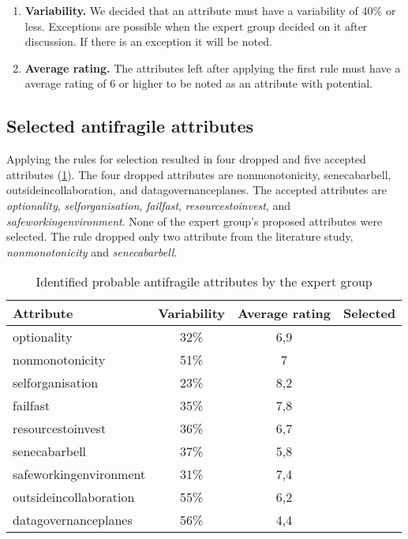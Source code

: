 \begin{enumerate}
	\item{\textbf{Variability.} We decided that an \gls{attribute} must have a variability of 40\% or less. Exceptions are possible when the expert group decided on it after discussion. If there is an exception it will be noted.}
	\item{\textbf{Average rating.} The attributes left after applying the first rule must have a average rating of 6 or higher to be noted as an attribute with potential.}
\end{enumerate}

\subsection{Selected antifragile attributes}
\label{sub:validationselectedafattributes}
Applying the rules for selection resulted in four dropped and five accepted \glspl{attribute} (\cref{tab:expertgrouppossiblesf}). The four dropped \glspl{attribute} are \gls{nonmonotonicity}, \gls{senecabarbell}, \gls{outsideincollaboration}, and \gls{datagovernanceplanes}. The accepted \glspl{attribute} are \textit{\gls{optionality}}, \textit{\gls{selforganisation}}, \textit{\gls{failfast}}, \textit{\gls{resourcestoinvest}}, and \textit{\gls{safeworkingenvironment}}. None of the expert group's proposed \glspl{attribute} were selected. The rule dropped only two \gls{attribute} from the literature study, \textit{\gls{nonmonotonicity}} and \textit{\gls{senecabarbell}}.
\begin{table}[H]
	\centering
		\begin{tabular}{@{}lccc@{}}
			\toprule
			\textbf{Attribute} & \textbf{Variability} & \textbf{Average rating} & \textbf{Selected} \\%
			\midrule
			\Gls{optionality} & 32\% & 6,9 & \checkmark \\%
			\Gls{nonmonotonicity} & 51\% & 7 &  \\%
			\Gls{selforganisation} & 23\% & 8,2 & \checkmark  \\%
			\Gls{failfast} & 35\% & 7,8 & \checkmark  \\%
			\Gls{resourcestoinvest} & 36\% & 6,7 & \checkmark \\%
			\Gls{senecabarbell} & 37\% & 5,8 &  \\%
			\Gls{safeworkingenvironment} & 31\% & 7,4 & \checkmark  \\%
			\Gls{outsideincollaboration} & 55\% & 6,2 &  \\%
			\Gls{datagovernanceplanes} & 56\% & 4,4 &  \\%
			\bottomrule
		\end{tabular}%
	\caption[Identified probable antifragile attributes by the expert group]{Identified probable antifragile attributes by the expert group}
	\label{tab:expertgrouppossiblesf}%
\end{table}%

